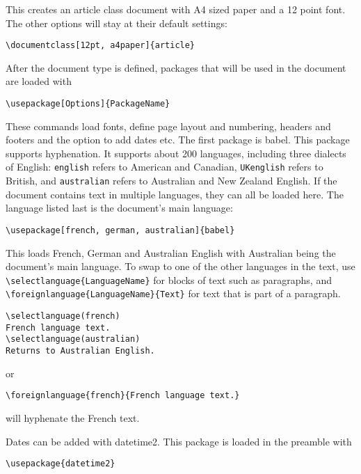 \documentclass[a4paper]{article}
\begin{document}
This creates an article class document with A4 sized paper and a 12 point font. The other options will stay at their default settings:

\begin{verbatim}
\documentclass[12pt, a4paper]{article}
\end{verbatim}

After the document type is defined, packages that will be used in the document are loaded with

\begin{verbatim}
\usepackage[Options]{PackageName}
\end{verbatim}

These commands load fonts, define page layout and numbering, headers and footers and the option to add dates etc. The first package is babel. This package supports hyphenation. It supports about 200 languages, including three dialects of English: \texttt{english} refers to American and Canadian, \texttt{UKenglish} refers to British, and \texttt{australian} refers to Australian and New Zealand English. If the document contains text in multiple languages, they can all be loaded here. The language listed last is the document’s main language:

\begin{verbatim}
\usepackage[french, german, australian]{babel}
\end{verbatim}

This loads French, German and Australian English with Australian being the document's main language. To swap to one of the other languages in the text, use \texttt{\textbackslash selectlanguage\{LanguageName\}} for blocks of text such as paragraphs, and \texttt{\textbackslash foreignlanguage\{LanguageName\}\{Text\}} for text that is part of a paragraph.

\begin{verbatim}
\selectlanguage(french)
French language text.
\selectlanguage(australian)
Returns to Australian English.
\end{verbatim}

or

\begin{verbatim}
\foreignlanguage{french}{French language text.}
\end{verbatim}

will hyphenate the French text.


Dates can be added with datetime2. This package is loaded in the preamble with 

\begin{verbatim}
\usepackage{datetime2}
\end{verbatim}
\end{document}
